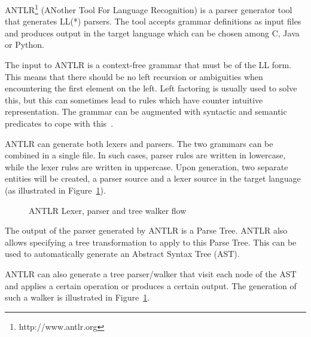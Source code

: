 

ANTLR\footnote{http://www.antlr.org} (ANother Tool For Language
Recognition) is a parser generator tool that generates LL(*)
parsers. The tool accepts grammar definitions as input files and
produces output in the target language which can be chosen among C,
Java or Python.

The input to ANTLR is a context-free grammar that must be of the LL
form. This means that there should be no left recursion or ambiguities
when encountering the first element on the left. Left factoring is
usually used to solve this, but this can sometimes lead to rules which
have counter intuitive representation. The grammar can be augmented with
syntactic and semantic predicates to cope with this~\cite{ANTLR,ANTLR2}.

ANTLR can generate both lexers and parsers. The two grammars can be
combined in a single file.  In such cases, parser rules are written in
lowercase, while the lexer rules are written in uppercase. Upon
generation, two separate entities will be created, a parser source and
a lexer source in the target language (as illustrated in Figure~\ref{fig:antlr_lexer_parser_walker}).

\begin{figure}[hb!]
  \centering
   \qquad
  \caption{ANTLR Lexer, parser and tree walker flow}
  \label{fig:antlr_lexer_parser_walker}
\end{figure}

The output of the parser generated by ANTLR is a Parse Tree. ANTLR
also allows specifying a tree transformation to apply to this Parse
Tree. This can be used to automatically generate an Abstract Syntax
Tree (AST).

ANTLR can also generate a tree parser/walker that visit each node of
the AST and applies a certain operation or produces a certain
output. The generation of such a walker is illustrated in Figure~\ref{fig:antlr_lexer_parser_walker}.
